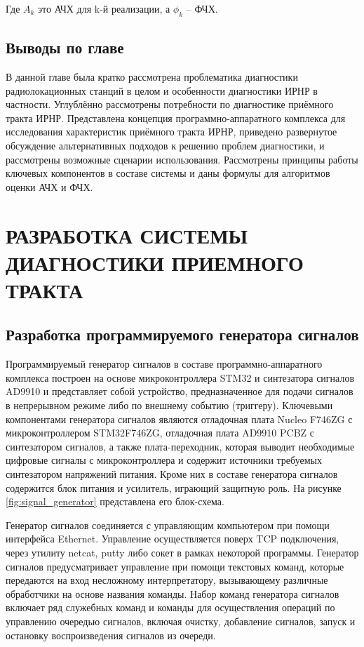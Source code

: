 \documentclass{report}
\begin{document}
Где $A_k$ это АЧХ для k-й реализации, а $\phi_k$ -- ФЧХ.

\section*{Выводы по главе}

В данной главе была кратко рассмотрена проблематика диагностики радиолокационных станций в целом и особенности диагностики ИРНР в частности. Углублённо рассмотрены потребности по диагностике приёмного тракта ИРНР. Представлена концепция программно-аппаратного комплекса для исследования характеристик приёмного тракта ИРНР, приведено развернутое обсуждение альтернативных подходов к решению проблем диагностики, и рассмотрены возможные сценарии использования. Рассмотрены принципы работы ключевых компонентов в составе системы и даны формулы для алгоритмов оценки АЧХ и ФЧХ.

\chapter{РАЗРАБОТКА СИСТЕМЫ ДИАГНОСТИКИ ПРИЕМНОГО ТРАКТА}
\setcounter{section}{0}
\setcounter{subsection}{0}
\setcounter{equation}{0}
\section{Разработка программируемого генератора сигналов}

Программируемый генератор сигналов в составе программно-аппаратного комплекса построен на основе микроконтроллера STM32 и синтезатора сигналов AD9910 и представляет собой устройство, предназначенное для подачи сигналов в непрерывном режиме либо по внешнему событию (триггеру). Ключевыми компонентами генератора сигналов являются отладочная плата Nucleo F746ZG с микроконтроллером STM32F746ZG, отладочная плата AD9910 PCBZ с синтезатором сигналов, а также плата-переходник, которая выводит необходимые цифровые сигналы с микроконтроллера и содержит источники требуемых синтезатором напряжений питания. Кроме них в составе генератора сигналов содержится блок питания и усилитель, играющий защитную роль. На рисунке \ref{fig:signal_generator} представлена его блок-схема.


Генератор сигналов соединяется с управляющим компьютером при помощи интерфейса Ethernet. Управление осуществляется поверх TCP подключения, через утилиту netcat, putty либо сокет в рамках некоторой программы. Генератор сигналов предусматривает управление при помощи текстовых команд, которые передаются на вход несложному интерпретатору, вызывающему различные обработчики на основе названия команды. Набор команд генератора сигналов включает ряд служебных команд и команды для осуществления операций по управлению очередью сигналов, включая очистку, добавление сигналов, запуск и остановку воспроизведения сигналов из очереди.
\end{document}
